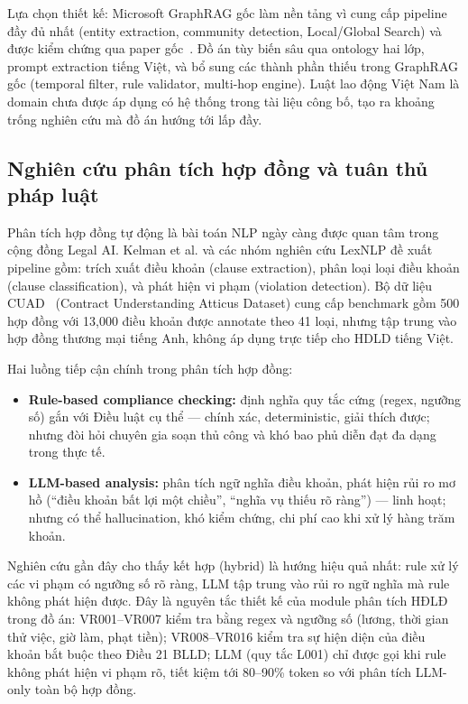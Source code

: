 \documentclass[../DoAn.tex]{subfiles}
\begin{document}
Lựa chọn thiết kế: Microsoft GraphRAG gốc làm nền tảng vì cung cấp pipeline đầy đủ nhất (entity extraction, community detection, Local/Global Search) và được kiểm chứng qua paper gốc~\cite{graphrag2024}. Đồ án tùy biến sâu qua ontology hai lớp, prompt extraction tiếng Việt, và bổ sung các thành phần thiếu trong GraphRAG gốc (temporal filter, rule validator, multi-hop engine). Luật lao động Việt Nam là domain chưa được áp dụng có hệ thống trong tài liệu công bố, tạo ra khoảng trống nghiên cứu mà đồ án hướng tới lấp đầy.

\subsection{Nghiên cứu phân tích hợp đồng và tuân thủ pháp luật}
\label{subsection:2.2.4}

Phân tích hợp đồng tự động là bài toán NLP ngày càng được quan tâm trong cộng đồng Legal AI. Kelman et al. và các nhóm nghiên cứu LexNLP đề xuất pipeline gồm: trích xuất điều khoản (clause extraction), phân loại loại điều khoản (clause classification), và phát hiện vi phạm (violation detection). Bộ dữ liệu CUAD~\cite{hendrycks2021cuad} (Contract Understanding Atticus Dataset) cung cấp benchmark gồm 500 hợp đồng với 13,000 điều khoản được annotate theo 41 loại, nhưng tập trung vào hợp đồng thương mại tiếng Anh, không áp dụng trực tiếp cho \gls{HDLD} tiếng Việt.

Hai luồng tiếp cận chính trong phân tích hợp đồng:

\begin{itemize}[nosep, leftmargin=*]
    \item \textbf{Rule-based compliance checking:} định nghĩa quy tắc cứng (regex, ngưỡng số) gắn với Điều luật cụ thể --- chính xác, deterministic, giải thích được; nhưng đòi hỏi chuyên gia soạn thủ công và khó bao phủ diễn đạt đa dạng trong thực tế.
    \item \textbf{LLM-based analysis:} phân tích ngữ nghĩa điều khoản, phát hiện rủi ro mơ hồ (``điều khoản bất lợi một chiều'', ``nghĩa vụ thiếu rõ ràng'') --- linh hoạt; nhưng có thể hallucination, khó kiểm chứng, chi phí cao khi xử lý hàng trăm khoản.
\end{itemize}

Nghiên cứu gần đây cho thấy kết hợp (hybrid) là hướng hiệu quả nhất: rule xử lý các vi phạm có ngưỡng số rõ ràng, LLM tập trung vào rủi ro ngữ nghĩa mà rule không phát hiện được. Đây là nguyên tắc thiết kế của module phân tích HĐLĐ trong đồ án: VR001--VR007 kiểm tra bằng regex và ngưỡng số (lương, thời gian thử việc, giờ làm, phạt tiền); VR008--VR016 kiểm tra sự hiện diện của điều khoản bắt buộc theo Điều 21 \gls{BLLD}; LLM (quy tắc L001) chỉ được gọi khi rule không phát hiện vi phạm rõ, tiết kiệm tới 80--90\% token so với phân tích LLM-only toàn bộ hợp đồng.
\end{document}
